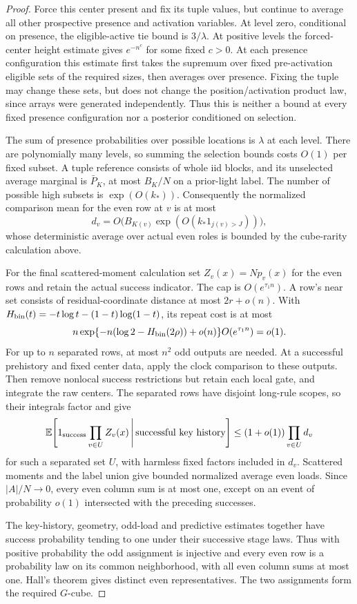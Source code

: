 \begin{proof}
Force this center present and fix its tuple values, but continue to
average all other prospective presence and activation variables. At
level zero, conditional on presence, the eligible-active tie bound is
\(3/\lambda\). At positive levels the forced-center height estimate
gives \(e^{-n^c}\) for some fixed \(c>0\). At each presence
configuration this estimate first takes the supremum over fixed
pre-activation eligible sets of the required sizes, then averages over
presence. Fixing the tuple may change these sets, but does not change
the position/activation product law, since arrays were generated
independently. Thus this is neither a bound at every fixed presence
configuration nor a posterior conditioned on selection.

The sum of presence probabilities over possible locations is
\(\lambda\) at each level. There are polynomially many levels, so
summing the selection bounds costs \(O(1)\) per fixed subset. A tuple
reference consists of whole iid blocks, and its unselected average
marginal is \(\bar P_K\), at most \(B_K/N\) on a prior-light label.
The number of possible high subsets is \(\exp(O(k_*))\). Consequently
the normalized comparison mean for the even row at \(v\) is at most
\[
 d_v=O\bigl(B_{K(v)}\exp(O(k_*1_{j(v)>J}))\bigr),
\]
whose deterministic average over actual even roles is bounded by the
cube-rarity calculation above.

For the final scattered-moment calculation set \(Z_v(x)=Np_v(x)\) for
the even rows and retain the actual success indicator. The cap is
\(O(e^{\tau_1n})\). A row's near set consists of residual-coordinate
distance at most \(2r+o(n)\). With
\(H_{\rm bin}(t)=-t\log t-(1-t)\log(1-t)\), its repeat cost is at most
\[
 n\exp\{-n(\log2-H_{\rm bin}(2\rho))+o(n)\}
                      O(e^{\tau_1n})=o(1).
\]
For up to \(n\) separated rows, at most \(n^2\) odd outputs are needed.
At a successful prehistory and fixed center data, apply the clock
comparison to these outputs. Then remove nonlocal success restrictions
but retain each local gate, and integrate the raw centers. The separated
rows have disjoint long-rule scopes, so their integrals factor and give
\[
 \mathbb E\!\left[1_{\rm success}\prod_{v\in U}Z_v(x)
                \,\middle|\,\text{successful key history}\right]
 \le (1+o(1))\prod_{v\in U}d_v
\]
for such a separated set \(U\), with harmless fixed factors included
in \(d_v\). Scattered moments and the label union give bounded normalized
average even loads. Since \(|A|/N\to0\), every even column sum is at
most one, except on an event of probability \(o(1)\) intersected with
the preceding successes.

The key-history, geometry, odd-load and predictive estimates together
have success probability tending to one under their successive stage
laws. Thus with positive probability the odd assignment is injective
and every even row is a probability law on its common neighborhood,
with all even column sums at most one. Hall's theorem gives distinct
even representatives. The two assignments form the required
\(G\)-cube.
\end{proof}
